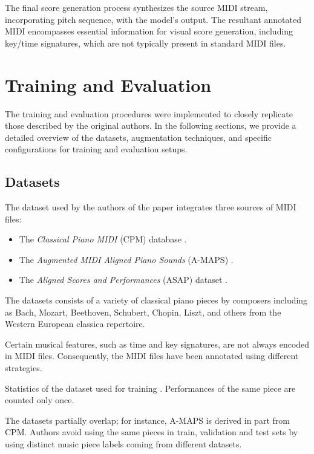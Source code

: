 The final score generation process synthesizes the source MIDI stream, incorporating pitch sequence, with the model's output. The resultant annotated MIDI encompasses essential information for visual score generation, including key/time signatures, which are not typically present in standard MIDI files.

\section{Training and Evaluation}

The training and evaluation procedures were implemented to closely replicate those described by the original authors. In the following sections, we provide a detailed overview of the datasets, augmentation techniques, and specific configurations for training and evaluation setups.

\subsection{Datasets}\label{datasets}

The dataset used by the authors of the paper \cite{Liu2022} integrates three sources of MIDI files: \begin{itemize}
	\item The \emph{Classical Piano MIDI} (CPM) database \cite{Krueger1996}.
	\item The \emph{Augmented MIDI Aligned Piano Sounds} (A-MAPS) \cite{Ycart2018}.
	\item The \emph{Aligned Scores and Performances} (ASAP) dataset \cite{Foscarin2020}.
\end{itemize}

The datasets consists of a variety of classical piano pieces by composers including as Bach, Mozart, Beethoven, Schubert, Chopin, Liszt, and others from the Western European classica repertoire.

Certain musical features, such as time and key signatures, are not always encoded in MIDI files. Consequently, the MIDI files have been annotated using different strategies.

\begin{table}[ht!]
\centering

\caption[Statistics of the dataset used for training.]{Statistics of the dataset used for training \cite{Liu2022}. Performances of the same piece are counted only once.}
\label{train_valid_test}
\end{table}

The datasets partially overlap; for instance, A-MAPS is derived in part from CPM. Authors avoid using the same pieces in train, validation and test sets by using distinct music piece labels coming from different datasets.


